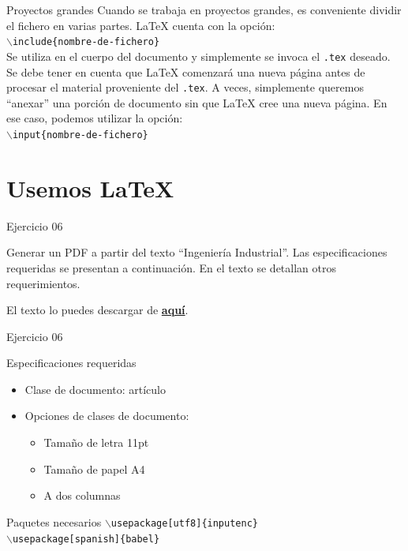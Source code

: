 \documentclass[10pt]{beamer}
\begin{document}
\begin{frame}{Proyectos grandes}
Cuando se trabaja en proyectos grandes, es conveniente dividir el fichero en varias partes. \LaTeX{} cuenta con la opción:\\
\texttt{$\backslash$include\{nombre-de-fichero\}}\\
Se utiliza en el cuerpo del documento y simplemente se invoca el \texttt{.tex} deseado. Se debe tener en cuenta que \LaTeX{} comenzará una nueva página antes de procesar el material proveniente del \texttt{.tex}. A veces, simplemente queremos “anexar” una porción de documento sin que \LaTeX{} cree una nueva página. En ese caso, podemos utilizar la opción:\\
\texttt{$\backslash$input\{nombre-de-fichero\}}
\end{frame}

\section{Usemos \LaTeX}

\begin{frame}{Ejercicio 06}
\begin{exampleblock}{}
Generar un PDF a partir del texto “Ingeniería Industrial”. Las especificaciones requeridas se presentan a continuación. En el texto se detallan otros requerimientos.
\end{exampleblock}

El texto lo puedes descargar de \href{https://www.dropbox.com/s/pn65pkujvzqsfs1/ing_industrial.pdf}{\textbf{aquí}}.
\end{frame}

\begin{frame}{Ejercicio 06}
\begin{exampleblock}{Especificaciones requeridas}
\begin{itemize}
\item Clase de documento: artículo
\item Opciones de clases de documento: 
	\begin{itemize}
		\item Tamaño de letra 11pt
		\item Tamaño de papel A4
		\item A dos columnas
	\end{itemize}
\end{itemize}
\end{exampleblock}
\begin{exampleblock}{Paquetes necesarios}
\texttt{$\backslash$usepackage[utf8]\{inputenc\} \\
$\backslash$usepackage[spanish]\{babel\}}
\end{exampleblock}

\end{frame}
\end{document}
